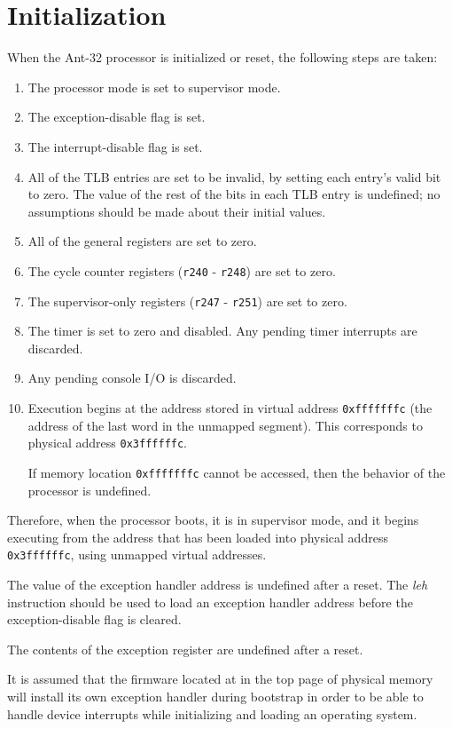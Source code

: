 
\chapter{Initialization}

When the Ant-32 processor is initialized or reset, the following steps
are taken:

\begin{enumerate}

	\item The processor mode is set to supervisor mode.

	\item The exception-disable flag is set.

	\item The interrupt-disable flag is set.

	\item All of the TLB entries are set to be invalid, by setting
		each entry's valid bit to zero.  The value of the rest
		of the bits in each TLB entry is undefined; no
		assumptions should be made about their initial values.

	\item All of the general registers are set to zero.

	\item The cycle counter registers ({\tt r240} - {\tt r248})
		are set to zero.

	\item The supervisor-only registers ({\tt r247} - {\tt r251})
		are set to zero.

	\item The timer is set to zero and disabled.  Any pending
		timer interrupts are discarded.

	\item Any pending console I/O is discarded.

	\item Execution begins at the address stored in virtual
		address {\tt 0xfffffffc} (the address of the last word
		in the unmapped segment).  This corresponds to
		physical address {\tt 0x3ffffffc}.

		If memory location {\tt 0xfffffffc} cannot be
		accessed, then the behavior of the processor is
		undefined.

\end{enumerate}

Therefore, when the processor boots, it is in supervisor mode, and it
begins executing from the address that has been loaded into physical
address {\tt 0x3ffffffc}, using unmapped virtual addresses.

The value of the exception handler address is undefined after a reset. 
The {\em leh} instruction should be used to load an exception handler
address before the exception-disable flag is cleared.

The contents of the exception register are undefined after a reset.

It is assumed that the firmware located at in the top page of physical
memory will install its own exception handler during bootstrap in
order to be able to handle device interrupts while initializing and
loading an operating system.

